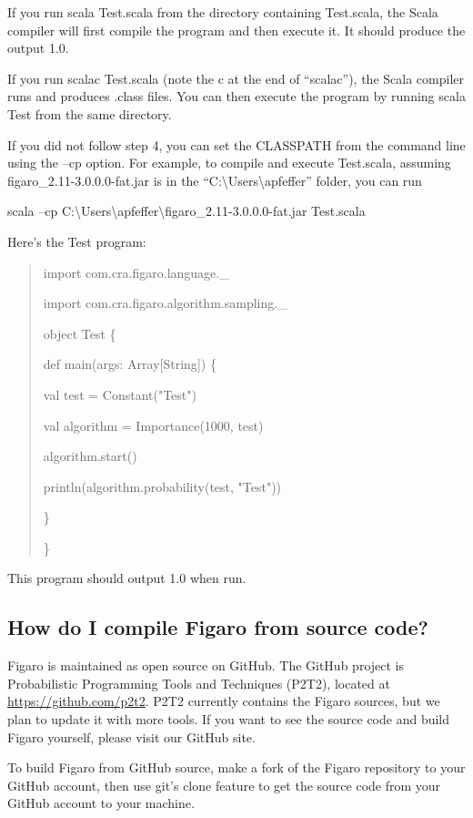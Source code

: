 \documentclass[]{article}
\begin{document}
If you run scala Test.scala from the directory containing Test.scala,
the Scala compiler will first compile the program and then execute it.
It should produce the output 1.0.

If you run scalac Test.scala (note the c at the end of ``scalac''), the
Scala compiler runs and produces .class files. You can then execute the
program by running scala Test from the same directory.

If you did not follow step 4, you can set the CLASSPATH from the command
line using the --cp option. For example, to compile and execute
Test.scala, assuming figaro\_2.11-3.0.0.0-fat.jar is in the
``C:\textbackslash{}Users\textbackslash{}apfeffer'' folder, you can run

scala --cp
C:\textbackslash{}Users\textbackslash{}apfeffer\textbackslash{}figaro\_2.11-3.0.0.0-fat.jar
Test.scala

Here's the Test program:

\begin{quote}
import com.cra.figaro.language.\_

import com.cra.figaro.algorithm.sampling.\_

object Test \{

def main(args: Array{[}String{]}) \{

val test = Constant("Test")

val algorithm = Importance(1000, test)

algorithm.start()

println(algorithm.probability(test, "Test"))

\}

\}
\end{quote}

This program should output 1.0 when run.

\subsection{How do I compile Figaro from source
code?}\label{how-do-i-compile-figaro-from-source-code}

Figaro is maintained as open source on GitHub. The GitHub project is
Probabilistic Programming Tools and Techniques (P2T2), located at
\url{https://github.com/p2t2}. P2T2 currently contains the Figaro
sources, but we plan to update it with more tools. If you want to see
the source code and build Figaro yourself, please visit our GitHub site.

To build Figaro from GitHub source, make a fork of the Figaro repository
to your GitHub account, then use git's clone feature to get the source
code from your GitHub account to your machine.
\end{document}
